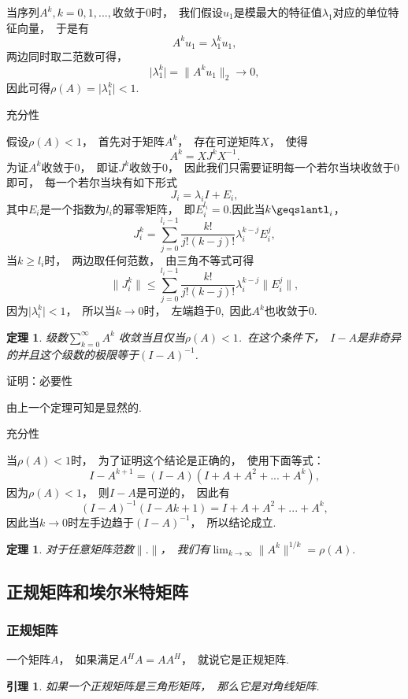 \documentclass{article}
\begin{document}
当序列$A^k,k=0,1,...,$收敛于0时，~我们假设$u_1$是模最大的特征值$\lambda _1$对应的单位特征向量，~于是有
$$A^ku_1=\lambda _1^ku_1,$$
两边同时取二范数可得，
$$\vert \lambda _1^k\vert=\parallel A^ku_1\parallel_2\longrightarrow 0,$$
因此可得$\rho (A)=\vert \lambda _1^k\vert<1.$

充分性

假设$\rho (A)<1$，~首先对于矩阵$A^k$，~存在可逆矩阵$X$，~使得
$$A^k=XJ^kX^{-1}.$$
为证$A^k$收敛于$0$，~即证$J^k$收敛于$0$，~因此我们只需要证明每一个若尔当块收敛于$0$即可，~每一个若尔当块有如下形式
$$J_i=\lambda _iI+E_i,$$
其中$E_i$是一个指数为$l_i$的幂零矩阵，~即$E_i^{l_i}=0$.因此当$k\geqslantl_i$，
$$J_i^k=\sum_{j=0}^{l_i-1}\frac{k!}{j!(k-j)!}\lambda _i^{k-j}E_i^j,$$
当$k\geqslant l_i$时，~两边取任何范数，~由三角不等式可得
$$\parallel J_i^k\parallel \leqslant \sum_{j=0}^{l_i-1}\frac{k!}{j!(k-j)!}\lambda _i^{k-j}\parallel E_i^j\parallel ,$$
因为$\vert \lambda _i^k\vert<1$，~所以当$k\longrightarrow 0$时，~左端趋于$0$,~因此$A^k$也收敛于$0$.


\newtheorem{thm}{定理}
\begin{thm}
级数$\sum_{k=0}^\infty A^k$ 收敛当且仅当$\rho (A)<1$.~在这个条件下，~$I-A$是非奇异的并且这个级数的极限等于$(I-A)^{-1}$.
\end{thm}
证明：必要性

由上一个定理可知是显然的.

充分性

当$\rho (A)<1$时，~为了证明这个结论是正确的，~使用下面等式：
$$I-A^{k+1}=(I-A)(I+A+A^2+...+A^k),$$
因为$\rho (A)<1$，~则$I-A$是可逆的，~因此有
$$(I-A)^{-1}(I-A{k+1})=I+A+A^2+...+A^k,$$
因此当$k\longrightarrow 0$时左手边趋于$(I-A)^{-1}$，~所以结论成立.




\newtheorem{thm}{定理}
\begin{thm}
对于任意矩阵范数$\parallel .\parallel$，~我们有$\lim_{k \to \infty}\parallel A^k\parallel ^{1/k}=\rho (A).$
\end{thm}

\subsection{正规矩阵和埃尔米特矩阵}
\subsubsection{正规矩阵}
一个矩阵$A$，~如果满足$A^HA=AA^H$，~就说它是正规矩阵.
\newtheorem{lemma}{引理}
\begin{lemma}
如果一个正规矩阵是三角形矩阵，~那么它是对角线矩阵.
\end{lemma}
\end{document}
